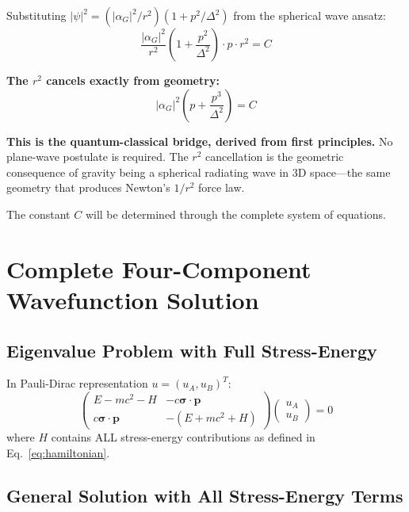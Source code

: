 \documentclass[11pt,a4paper]{article}
\theoremstyle{definition}
\theoremstyle{remark}
\begin{document}
	Substituting $|\psi|^2 = (|\alpha_G|^2/r^2)(1 + p^2/\Delta^2)$ from the spherical wave ansatz:
	\begin{equation}
		\frac{|\alpha_G|^2}{r^2}\!\left(1 + \frac{p^2}{\Delta^2}\right)\cdot p \cdot r^2 = C
	\end{equation}
	
	\textbf{The $r^2$ cancels exactly from geometry:}
	\begin{equation}
		\boxed{|\alpha_G|^2\!\left(p + \frac{p^3}{\Delta^2}\right) = C}
		\label{eq:cubic_from_geometry}
	\end{equation}
	
	\textbf{This is the quantum-classical bridge, derived from first principles.}  No plane-wave postulate is required.  The $r^2$ cancellation is the geometric consequence of gravity being a spherical radiating wave in 3D space---the same geometry that produces Newton's $1/r^2$ force law.
	
	The constant $C$ will be determined through the complete system of equations.
	
	\section{Complete Four-Component Wavefunction Solution}
	
	\subsection{Eigenvalue Problem with Full Stress-Energy}
	
	In Pauli-Dirac representation $u=(u_A,u_B)^T$:
	\begin{equation}
		\begin{pmatrix} E-mc^2-H & -c\boldsymbol{\sigma}\cdot\mathbf{p} \\ c\boldsymbol{\sigma}\cdot\mathbf{p} & -(E+mc^2+H) \end{pmatrix}
		\begin{pmatrix} u_A \\ u_B \end{pmatrix} = 0
		\label{eq:coupled_system}
	\end{equation}
	where $H$ contains ALL stress-energy contributions as defined in Eq.~\eqref{eq:hamiltonian}.
	
	\subsection{General Solution with All Stress-Energy Terms}
	
\end{document}
